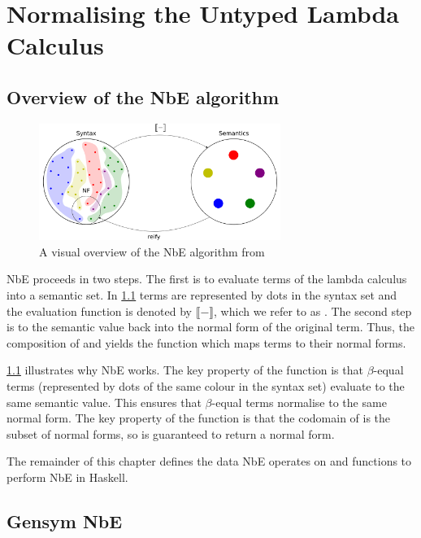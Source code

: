 \chapter{Normalising the Untyped Lambda Calculus}
\label{chap:untypednbe}

\section{Overview of the NbE algorithm}

\begin{figure}[h]
    \centering
    \includegraphics[width=0.7\textwidth]{./images/nbe_diagram}
    \caption{A visual overview of the NbE algorithm from \cite{slides}}
    \label{fig:nbeOverview}
\end{figure}

NbE proceeds in two steps. The first is to evaluate terms of the lambda calculus into a semantic set. In \ref{fig:nbeOverview} terms are represented by dots in the syntax set and the evaluation function is denoted by $\llbracket - \rrbracket$, which we refer to as . The second step is to  the semantic value back into the normal form of the original term. Thus, the composition of  and  yields the  function which maps terms to their normal forms. 

\ref{fig:nbeOverview} illustrates why NbE works. The key property of the  function is that $\beta$-equal terms (represented by dots of the same colour in the syntax set) evaluate to the same semantic value. This ensures that $\beta$-equal terms normalise to the same normal form. The key property of the  function is that the codomain of  is the subset of normal forms, so  is guaranteed to return a normal form. 

The remainder of this chapter defines the data NbE operates on and functions to perform NbE in Haskell.

\section{Gensym NbE}

